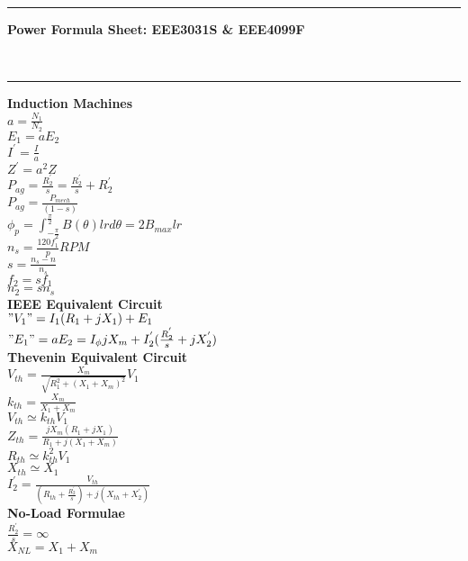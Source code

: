 \documentclass[a4paper, 10pt]{article}
\begin{document}
\hrule
\begin{center}
\begin{LARGE}
\textbf{Power Formula Sheet: EEE3031S \& EEE4099F}
\end{LARGE} \\
\end{center}
\hrule



\begin{paracol}{3}[]
\medskip
\textbf{Induction Machines}\\
$a=\frac{N_1}{N_2}$\\
$E_1=aE_2$\\
$I^{'}=\frac{I}{a}$\\
$Z^{'}=a^2Z$\\
$P_{ag}=\frac{R_{2}^{'}}{s} = \frac{R_{2}^{'}}{s} + R_{2}^{'}$\\
$P_{ag}=\frac{P_{mech}}{(1-s)}$\\
$\phi_p = \int_{-\frac{\pi}{2}}^{\frac{\pi}{2}} B(\theta)lrd\theta = 2B_{max}lr$\\
$n_s=\frac{120f_1}{p} RPM$\\
$s=\frac{n_s-n}{n_s}$\\
$f_2=sf_1$\\
$n_2=sn_s$\\

\textbf{IEEE Equivalent Circuit}\\
$"V_1"=I_1(R_1+jX_1)+E_1$\\
$"E_1"=aE_2=I_\phi jX_m + I_{2}^{'}(\frac{R_{2}^{'}}{s}+jX_{2}^{'})$\\

\textbf{Thevenin Equivalent Circuit}\\
$V_{th}=\frac{X_m}{\sqrt{R_1^2 + (X_1 + X_m)^2}}V_1$\\
$k_{th}=\frac{X_m}{X_1 + X_m}$\\
$V_{th}\simeq k_{th}V_1$\\
$Z_{th}=\frac{jX_m(R_1+jX_1)}{R_1+j(X_1+X_m)}$\\
$R_{th}\simeq k_{th}^2V_1$\\
$X_{th}\simeq X_1$\\
$I_{2}^{'}=\frac{V_{th}}{(R_{th}+\frac{R_{2}^{'}}{s})+j(X_{th}+X_{2}^{'})}$\\

\textbf{No-Load Formulae}\\
$\frac{R_{2}^{'}}{s}=\infty$\\
$X_{NL}=X_1+X_m$\\


\end{paracol}
\end{document}
